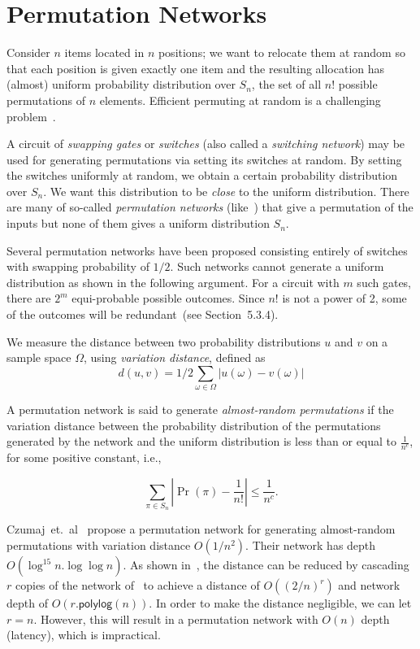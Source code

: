 \documentclass[10pt]{article}
\theoremstyle{plain}
\begin{document}
\section{Permutation Networks}

Consider $n$ items located in $n$ positions; we want to relocate
them at random so that each position is given exactly one item and
the resulting allocation has (almost) uniform probability distribution
over $S_{n}$, the set of all $n!$ possible permutations of $n$
elements. Efficient permuting at random is a challenging problem~\cite{Czumaj01switchingnetworks}.

A circuit of \emph{swapping gates} or \emph{switches} (also called
a \emph{switching network}) may be used for generating permutations
via setting its switches at random. By setting the switches uniformly
at random, we obtain a certain probability distribution over $S_{n}$.
We want this distribution to be \emph{close} to the uniform distribution.
There are many of so-called \emph{permutation networks} (like~\cite{Waksman:1968:PN:321439.321449})
that give a permutation of the inputs but none of them gives a uniform
distribution $S_{n}$.

Several permutation networks have been proposed consisting entirely
of switches with swapping probability of $1/2$. Such networks cannot
generate a uniform distribution as shown in the following argument.
For a circuit with $m$ such gates, there are $2^{m}$ equi-probable
possible outcomes. Since $n!$ is not a power of 2, some of the outcomes
will be redundant~(see \cite{Knuth:1998:ACP:280635} Section~5.3.4).

We measure the distance between two probability distributions $u$
and $v$ on a sample space $\Omega$, using \emph{variation distance},
defined as 
\[
d(u,v)=1/2\sum_{\omega\in\Omega}|u(\omega)-v(\omega)|
\]

A permutation network is said to generate \emph{almost-random permutations}
if the variation distance between the probability distribution of
the permutations generated by the network and the uniform distribution
is less than or equal to $\frac{1}{n^{c}}$, for some positive constant,
i.e., 

\[
\sum_{\pi\in S_{n}}|\Pr(\pi)-\frac{1}{n!}|\leq\frac{1}{n^{c}}.
\]

Czumaj~et.~al~\cite{Czumaj01switchingnetworks} propose a permutation
network for generating almost-random permutations with variation distance
$O(1/n^{2})$. Their network has depth $O(\log^{15}{n}.\log{\log{n}})$.
As shown in~\cite{Boyle:2013:CLS:2450206.2450227}, the distance
can be reduced by cascading $r$ copies of the network of~\cite{Czumaj01switchingnetworks}
to achieve a distance of $O((2/n)^{r})$ and network depth of $O(r.\mathsf{polylog}(n))$.
In order to make the distance negligible, we can let $r=n$. However,
this will result in a permutation network with $O(n)$ depth (latency),
which is impractical.
\end{document}
